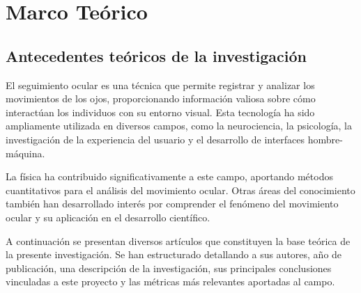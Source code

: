 \chapter{Marco Teórico}


\section{Antecedentes teóricos de la investigación}

El seguimiento ocular es una técnica que permite registrar y analizar los movimientos de los ojos, proporcionando información valiosa sobre cómo interactúan los individuos con su entorno visual. Esta tecnología ha sido ampliamente utilizada en diversos campos, como la neurociencia, la psicología, la investigación de la experiencia del usuario y el desarrollo de interfaces hombre-máquina.

La física ha contribuido significativamente a este campo, aportando métodos cuantitativos para el análisis del movimiento ocular. Otras áreas del conocimiento también han desarrollado interés por comprender el fenómeno del movimiento ocular y su aplicación en el desarrollo científico.

A continuación se presentan diversos artículos que constituyen la base teórica de la presente investigación. Se han estructurado detallando a sus autores, año de publicación, una descripción de la investigación, sus principales conclusiones vinculadas a este proyecto y las métricas más relevantes aportadas al campo.

